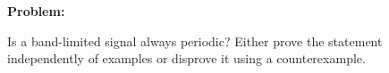 \documentclass{article}
\begin{document}
\textbf{Problem:}

Is a band-limited signal always periodic? Either prove the statement independently of examples or disprove it using a counterexample.
\end{document}
